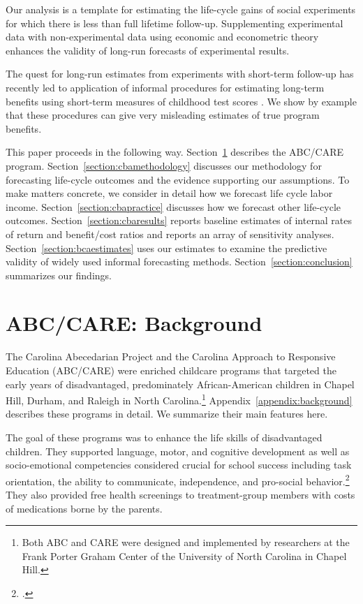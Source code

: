 Our analysis is a template for estimating the life-cycle gains of social experiments for which there is less than full lifetime follow-up. Supplementing experimental data with non-experimental data using economic and econometric theory enhances the validity of long-run forecasts of experimental results.

The quest for long-run estimates from experiments with short-term follow-up has recently led to application of informal procedures for estimating long-term benefits using short-term measures of childhood test scores \citep[e.g.][]{Chetty_Friedman_etal_2011_QJoE,Kline_Walters_2016_QJE}. We show by example that these procedures can give very misleading estimates of true program benefits.

This paper proceeds in the following way. Section~\ref{section:background} describes the ABC/CARE program. Section~\ref{section:cbamethodology} discusses our methodology for forecasting life-cycle outcomes and the evidence supporting our assumptions. To make matters concrete, we consider in detail how we forecast life cycle labor income. Section~\ref{section:cbapractice} discusses how we forecast other life-cycle outcomes. Section~\ref{section:cbaresults} reports baseline estimates of internal rates of return and benefit/cost ratios and reports an array of sensitivity analyses. Section~\ref{section:bcaestimates} uses our estimates to examine the predictive validity of widely used informal forecasting methods. Section~\ref{section:conclusion} summarizes our findings.

\section{ABC/CARE: Background} \label{section:background}

\noindent The Carolina Abecedarian Project and the Carolina Approach to Responsive Education (ABC/CARE) were enriched childcare programs that targeted the early years of disadvantaged, predominately African-American children in Chapel Hill, Durham, and Raleigh in North Carolina.\footnote{Both ABC and CARE were designed and implemented by researchers at the Frank Porter Graham Center of the University of North Carolina in Chapel Hill.} Appendix~\ref{appendix:background} describes these programs in detail. We summarize their main features here.

The goal of these programs was to enhance the life skills of disadvantaged children. They supported language, motor, and cognitive development as well as socio-emotional competencies considered crucial for school success including task orientation, the ability to communicate, independence, and pro-social behavior.\footnote{\citet{Sparling_1974_Synth_Edu_Infant_SPEECH, Ramey_Collier_etal_1976_CarolinaAbecedarianProject, Ramey_etal_1985_Project-CARE_TiECSE, Wasik_Ramey_etal_1990_CD, Ramey-etal_2012-ABC}.} They also provided free health screenings to treatment-group members with costs of medications borne by the parents.

